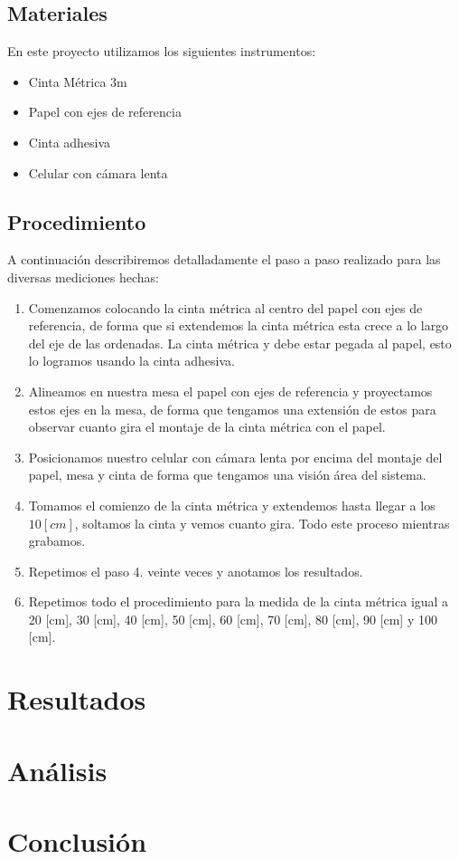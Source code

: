 \documentclass{article}
\begin{document}
    \subsection{Materiales}
    En este proyecto utilizamos los siguientes instrumentos:
    \begin{itemize}
        \item Cinta Métrica 3m
        \item Papel con ejes de referencia
        \item Cinta adhesiva
        \item Celular con cámara lenta
    \end{itemize}
    \subsection{Procedimiento}
    A continuación describiremos detalladamente el paso a paso realizado para las diversas mediciones hechas:
        \begin{enumerate}
            \item Comenzamos colocando la cinta métrica al centro del papel con ejes de referencia, de forma que si extendemos la cinta métrica esta crece a lo largo del eje de las ordenadas. La cinta métrica y debe estar pegada al papel, esto lo logramos usando la cinta adhesiva.
            \item Alineamos en nuestra mesa el papel con ejes de referencia y proyectamos estos ejes en la mesa, de forma que tengamos una extensión de estos para observar cuanto gira el montaje de la cinta métrica con el papel. 
            \item Posicionamos nuestro celular con cámara lenta por encima del montaje del papel, mesa y cinta de forma que tengamos una visión área del sistema.
            \item Tomamos el comienzo de la cinta métrica y extendemos hasta llegar a los $10 [cm]$, soltamos la cinta y vemos cuanto gira. Todo este proceso mientras grabamos. 
            \item Repetimos el paso 4. veinte veces y anotamos los resultados.
            \item Repetimos todo el procedimiento para la medida de la cinta métrica igual a 20 [cm], 30 [cm], 40 [cm], 50 [cm], 60 [cm], 70 [cm], 80 [cm], 90 [cm] y 100 [cm].
            
        \end{enumerate}



\section{Resultados}

\section{Análisis}


\section{Conclusión}




\end{document}

